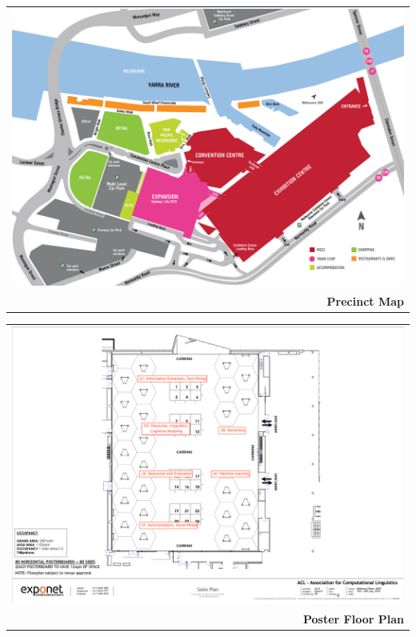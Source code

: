 
\thispagestyle{empty}
\begin{center}
    \begin{tabular}{r}
    \includegraphics[width=\textwidth]{content/maps/mcec_precinct.pdf}\\
    \textbf{Precinct Map}
    \end{tabular}
\end{center}

\newpage
\thispagestyle{empty}
\begin{center}
    \begin{tabular}{r}
    \includegraphics[width=\textwidth]{content/maps/mcec_poster.pdf} \\
    \textbf{Poster Floor Plan}
    \end{tabular}
\end{center}

